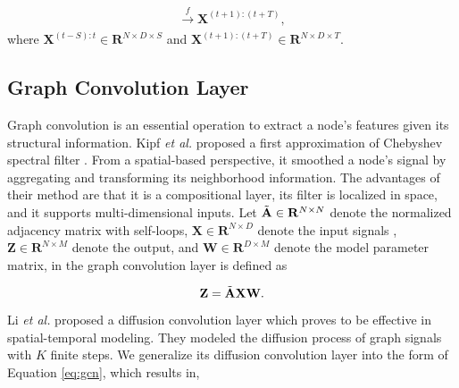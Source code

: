 \begin{equation}
    [\mathbf{X}^{(t-S):t},G] \xrightarrow[]{f} \mathbf{X}^{(t+1):(t+T)}, 
\end{equation}
where $\mathbf{X}^{(t-S):t} \in \mathbf{R}^{N \times D \times S}$ and  $\mathbf{X}^{(t+1):(t+T)} \in \mathbf{R}^{ N \times D \times T}$. 





\subsection{Graph Convolution Layer}

Graph convolution is an essential operation to extract a node's features given its structural information. Kipf \emph{et al.}  proposed a first approximation of Chebyshev spectral filter \cite{defferrard2016convolutional}. From a spatial-based perspective, it smoothed a node's signal by aggregating and transforming its neighborhood information. The advantages of their method are that it is a compositional layer, its filter is localized in space, and it supports multi-dimensional inputs. Let $\Tilde{\mathbf{A}}\in \mathbf{R}^{N\times N}$ denote the normalized adjacency matrix with self-loops, $\mathbf{X} \in \mathbf{R}^{N\times D}$ denote the input signals , $\mathbf{Z} \in \mathbf{R}^{N\times M}$ denote the output, and $\mathbf{W} \in \mathbf{R}^{D\times M}$ denote the model parameter matrix, in \cite{kipf2016semi} the graph convolution layer is defined as


\begin{equation}
    \label{eq:gcn}
    \mathbf{Z} = \Tilde{\mathbf{A}}\mathbf{X}\mathbf{W}.
\end{equation}
Li \emph{et al.}  proposed a diffusion convolution layer which proves to be effective in spatial-temporal modeling. They modeled the diffusion process of graph signals with $K$ finite steps. We generalize its diffusion convolution layer into the form of Equation \ref{eq:gcn}, which results in,

